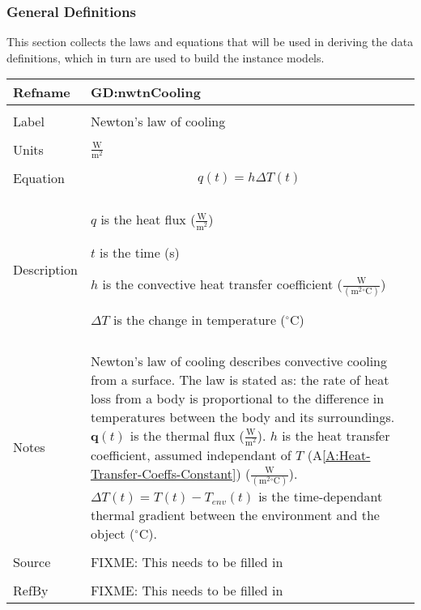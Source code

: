 \documentclass[12pt]{article}
\begin{document}
\subsubsection{General Definitions}
\label{Sec:GDs}
This section collects the laws and equations that will be used in deriving the data definitions, which in turn are used to build the instance models.
~\newline
\noindent \begin{minipage}{\textwidth}
\begin{tabular}{p{} p{}}
\toprule \textbf{Refname} & \textbf{GD:nwtnCooling}
\label{GD:nwtnCooling}
\\ \midrule \\
Label & Newton's law of cooling
\\ \midrule \\
Units & $\frac{\text{W}}{\text{m}^{2}}$
\\ \midrule \\
Equation & \begin{dmath}
           q\left(t\right)=h ΔT\left(t\right)
           \end{dmath}
\\ \midrule \\
Description & \begin{symbDescription}
              \item{$q$ is the heat flux ($\frac{\text{W}}{\text{m}^{2}}$)}
              \item{$t$ is the time (s)}
              \item{$h$ is the convective heat transfer coefficient ($\frac{\text{W}}{(\text{m}^{2}{}^{\circ}\text{C})}$)}
              \item{$ΔT$ is the change in temperature (${}^{\circ}$C)}
              \end{symbDescription}
\\ \midrule \\
Notes & Newton's law of cooling describes convective cooling from a surface. The law is stated as: the rate of heat loss from a body is proportional to the difference in temperatures between the body and its surroundings. $\mathbf{q}\left(t\right)$ is the thermal flux ($\frac{\text{W}}{\text{m}^{2}}$). $h$ is the heat transfer coefficient, assumed independant of $T$ (A\ref{A:Heat-Transfer-Coeffs-Constant}) ($\frac{\text{W}}{(\text{m}^{2}{}^{\circ}\text{C})}$). $ΔT\left(t\right)=T\left(t\right)-{T_{env}}\left(t\right)$ is the time-dependant thermal gradient between the environment and the object (${}^{\circ}$C).
\\ \midrule \\
Source & FIXME: This needs to be filled in
\\ \midrule \\
RefBy & FIXME: This needs to be filled in
\\ \bottomrule \end{tabular}
\end{minipage}\\
\end{document}
